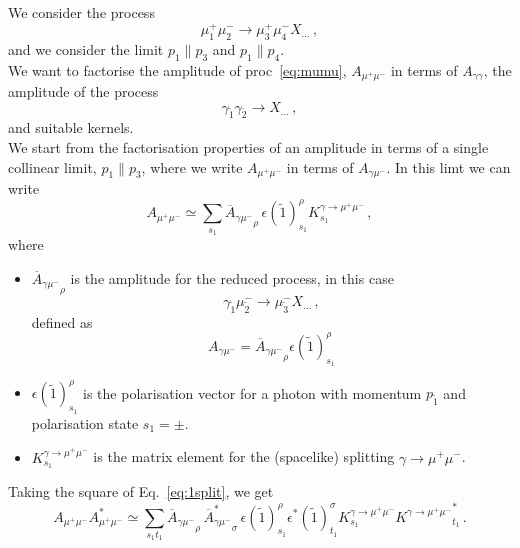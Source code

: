 \documentclass[a4paper,10pt]{article}
\begin{document}
We consider the process
\begin{equation}
    \mu^+_1 \mu^-_2 \to \mu^+_3 \mu^-_4 X_{\ldots}\,,
    \label{eq:mumu}
\end{equation}
and we consider the limit $p_1\parallel p_3$ and $p_1\parallel p_4$.\\
We want to factorise the amplitude of proc~\ref{eq:mumu}, $A_{\mu^+\mu^-}$
in terms of $A_{\gamma\gamma}$, the amplitude of the process
\begin{equation}
    \gamma_{\tilde 1} \gamma_{\tilde 2} \to X_{\ldots}\,,
    \label{eq:aa}
\end{equation}
and suitable kernels.\\
We start from the factorisation properties of an amplitude in terms of a single collinear limit, $p_1\parallel p_3$, where
we write $A_{\mu^+\mu^-}$ in terms of  $A_{\gamma \mu^-}$. In this limt we can write
\begin{equation}
    A_{\mu^+ \mu^-} \simeq \sum_{s_1} {\overline A_{\gamma \mu^-} }_\rho\,  \epsilon(\tilde 1)^\rho_{s_1} K^{\gamma\to\mu^+\mu^-}_{s_1}\,,
    \label{eq:1split}
\end{equation}
where
\begin{itemize}
        \item $  {\overline A_{\gamma \mu^-}}_\rho$ is the amplitude for the reduced process, in this case 
            \begin{equation}
                \gamma_{\tilde 1} \mu^-_{\tilde 2} \to \mu^-_{\tilde 3} X_{\ldots}\,,
            \end{equation}
             defined as 
            \begin{equation}
             A_{\gamma \mu^-}  = {\overline A_{\gamma \mu^-}}_\rho \epsilon(\tilde 1)^\rho_{s_1}
            \end{equation}
        \item $\epsilon(\tilde 1)^\rho_{s_1}$ is the polarisation vector for a photon with momentum $p_{\tilde 1}$ and polarisation
        state $s_1 =\pm$.
        \item $ K^{\gamma\to\mu^+\mu^-}_{s_1} $ is the matrix element for the (spacelike) splitting $\gamma\to \mu^+\mu^-$.
\end{itemize}
Taking the square of Eq.~\ref{eq:1split}, we get
\begin{equation}
    A_{\mu^+ \mu^-} A_{\mu^+ \mu^-}^* \simeq 
    \sum_{s_1 t_1} {\overline A_{\gamma \mu^-} }_\rho\,  {\overline A^*_{\gamma \mu^-} }_\sigma 
    \, \epsilon(\tilde 1)^\rho_{s_1}  \epsilon^*(\tilde 1)^\sigma_{t_1} K^{\gamma\to\mu^+\mu^-}_{s_1} {K^{\gamma\to\mu^+\mu^-}}^*_{t_1}\,.
\end{equation}
\end{document}
